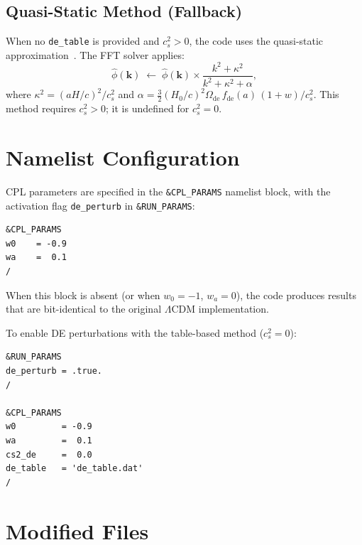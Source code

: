 \documentclass[11pt,fleqn]{book}
\begin{document}
\subsection{Quasi-Static Method (Fallback)}

When no \texttt{de\_table} is provided and $c_s^2 > 0$, the code uses the
quasi-static approximation~\cite{Bean2004}.  The FFT solver applies:
\begin{equation}\label{eq:de_factor_qs}
  \hat\phi(\mathbf{k}) \;\leftarrow\; \hat\phi(\mathbf{k}) \times
  \frac{k^2 + \kappa^2}{k^2 + \kappa^2 + \alpha},
\end{equation}
where $\kappa^2 = (aH/c)^2/c_s^2$ and $\alpha = \frac{3}{2}(H_0/c)^2
\Omega_{\mathrm{de}}\,f_{\mathrm{de}}(a)\,(1+w)/c_s^2$.  This method
requires $c_s^2 > 0$; it is undefined for $c_s^2 = 0$.

\section{Namelist Configuration}

CPL parameters are specified in the \texttt{\&CPL\_PARAMS} namelist block,
with the activation flag \texttt{de\_perturb} in \texttt{\&RUN\_PARAMS}:
\begin{codebox}
\begin{lstlisting}[style=fortran,numbers=none]
&CPL_PARAMS
w0    = -0.9
wa    =  0.1
/
\end{lstlisting}
\end{codebox}
When this block is absent (or when $w_0 = -1$, $w_a = 0$), the code produces results that are bit-identical to the original $\Lambda$CDM implementation.

To enable DE perturbations with the table-based method ($c_s^2 = 0$):
\begin{codebox}
\begin{lstlisting}[style=fortran,numbers=none]
&RUN_PARAMS
de_perturb = .true.
/

&CPL_PARAMS
w0         = -0.9
wa         =  0.1
cs2_de     =  0.0
de_table   = 'de_table.dat'
/
\end{lstlisting}
\end{codebox}

\section{Modified Files}
\end{document}
